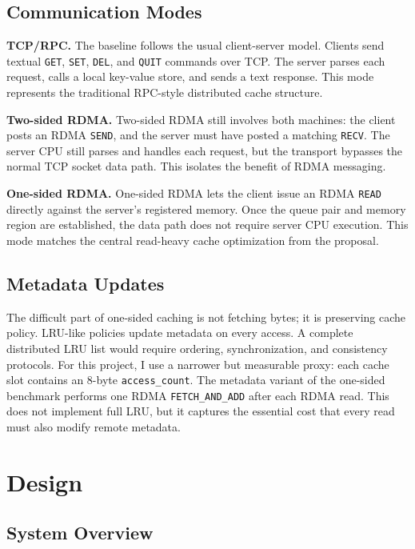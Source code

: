 \documentclass[letterpaper,twocolumn,10pt]{article}
\begin{document}
\subsection{Communication Modes}

\textbf{TCP/RPC.}
The baseline follows the usual client-server model.  Clients send textual
\texttt{GET}, \texttt{SET}, \texttt{DEL}, and \texttt{QUIT} commands over TCP.
The server parses each request, calls a local key-value store, and sends a
text response.  This mode represents the traditional RPC-style distributed
cache structure.

\textbf{Two-sided RDMA.}
Two-sided RDMA still involves both machines: the client posts an RDMA
\texttt{SEND}, and the server must have posted a matching \texttt{RECV}.  The
server CPU still parses and handles each request, but the transport bypasses
the normal TCP socket data path.  This isolates the benefit of RDMA messaging.

\textbf{One-sided RDMA.}
One-sided RDMA lets the client issue an RDMA \texttt{READ} directly against
the server's registered memory.  Once the queue pair and memory region are
established, the data path does not require server CPU execution.  This mode
matches the central read-heavy cache optimization from the proposal.

\subsection{Metadata Updates}

The difficult part of one-sided caching is not fetching bytes; it is preserving
cache policy.  LRU-like policies update metadata on every access.  A complete
distributed LRU list would require ordering, synchronization, and consistency
protocols.  For this project, I use a narrower but measurable proxy: each
cache slot contains an 8-byte \texttt{access\_count}.  The metadata variant of
the one-sided benchmark performs one RDMA \texttt{FETCH\_AND\_ADD} after each
RDMA read.  This does not implement full LRU, but it captures the essential
cost that every read must also modify remote metadata.

\section{Design}

\subsection{System Overview}
\end{document}

